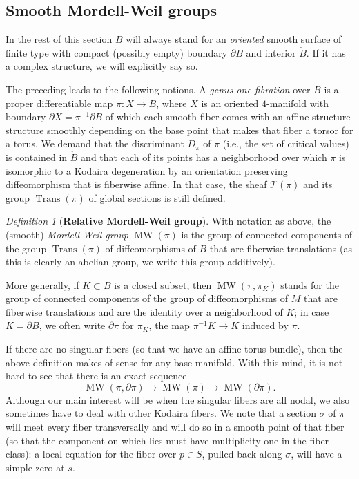 \documentclass[10pt,letterpaper]{amsart}
\numberwithin{equation}{section}
\newcommand{\p}{\partial}
\def\Tscr{{\mathscr T}}
\newcommand\MW{\operatorname{MW}}
\newcommand\Trans{\operatorname{Trans}}
\theoremstyle{remark}
\newtheorem{definition}[theorem]{Definition}
\begin{document}
\subsection{Smooth Mordell-Weil groups} In the rest of this section $B$ will always stand for  an \emph{oriented} smooth surface of finite type with compact (possibly empty) boundary $\p B$ and interior $\mathring B$. If it has  a complex structure, we will explicitly say so.

The preceding  leads to the following notions. A \emph{genus one fibration} over $B$  is
a proper differentiable map $\pi: X\to B$, where $X$ is an oriented  $4$-manifold with boundary $\p X=\pi^{-1}\p B$ of which each  smooth fiber comes with an affine structure structure smoothly depending on the base point  that makes that fiber a torsor for  a torus. We demand that the discriminant $D_\pi$ of $\pi$ (i.e., the set of critical values) is contained in $\mathring B$ and that each of its points has a neighborhood  over which  $\pi$ is isomorphic to a Kodaira degeneration by an orientation preserving  diffeomorphism that is fiberwise affine. In that case, the sheaf $\Tscr(\pi)$ and its group $\Trans(\pi)$ of global sections is still defined.
\begin{definition}[{\bf Relative Mordell-Weil group}]
\label{def:MWdiff} 
With notation as above, the (smooth) \emph{Mordell-Weil group}  $\MW(\pi)$ is the group of connected components of the group $\Trans(\pi)$ of diffeomorphisms of $B$ that are fiberwise translations (as this is clearly an abelian group, we write this group additively). 

More generally, if $K\subset B$ is a closed subset, then
$\MW(\pi, \pi_K)$ stands for  the group of connected components of the group of diffeomorphisms of $M$ that are fiberwise translations and are the identity over a neighborhood of $K$; in case $K=\p B$, we often write 
$\p\pi$ for $\pi_K$, the map $\pi^{-1}K\to K$ induced by $\pi$.
\end{definition}

If there are no singular fibers (so that we have an affine  torus bundle), then the above definition makes of sense for any base manifold. With this mind, it is not hard to see that there is 
an exact sequence
\[
\MW(\pi, \p\pi)\to \MW(\pi)\to \MW(\p\pi).
\]
Although our main interest will be when the singular fibers are all nodal, we also sometimes  have to deal with other Kodaira fibers. 
We note that a section $\sigma$ of $\pi$ will meet every fiber transversally and will do so in a smooth point of that fiber (so that the component on which lies must have multiplicity one in the fiber class): a local equation for the fiber over $p\in S$,
pulled back along $\sigma$, will have a simple zero at $s$.
\end{document}
